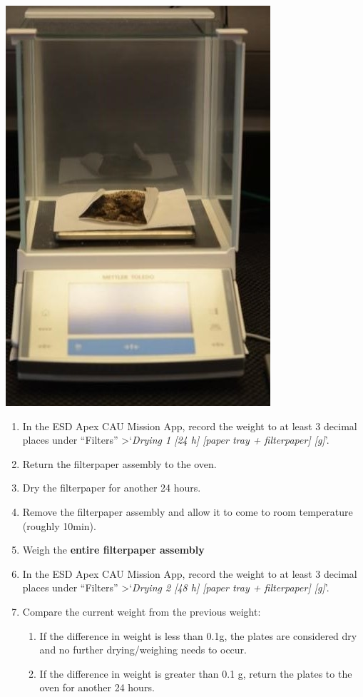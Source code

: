 \documentclass[]{book}
\providecommand{\tightlist}{%
  \setlength{\itemsep}{0pt}\setlength{\parskip}{0pt}}
\begin{document}
\includegraphics{images/CAU_weigh.jpg}

\begin{enumerate}
\def\labelenumi{\arabic{enumi}.}
\setcounter{enumi}{3}
\item
  In the ESD Apex CAU Mission App, record the weight to at least 3 decimal places under ``Filters'' \textgreater{}`\emph{Drying 1 {[}24 h{]} {[}paper tray + filterpaper{]} {[}g{]}}'.
\item
  Return the filterpaper assembly to the oven.
\item
  Dry the filterpaper for another 24 hours.
\item
  Remove the filterpaper assembly and allow it to come to room temperature (roughly 10min).
\item
  Weigh the \textbf{entire filterpaper assembly}
\item
  In the ESD Apex CAU Mission App, record the weight to at least 3 decimal places under ``Filters'' \textgreater{}`\emph{Drying 2 {[}48 h{]} {[}paper tray + filterpaper{]} {[}g{]}}'.
\item
  Compare the current weight from the previous weight:

  \begin{enumerate}
  \def\labelenumii{\alph{enumii}.}
  \tightlist
  \item
    If the difference in weight is less than 0.1g, the plates are considered dry and no further drying/weighing needs to occur.\\
  \item
    If the difference in weight is greater than 0.1 g, return the plates to the oven for another 24 hours.
  \end{enumerate}
\end{enumerate}
\end{document}
